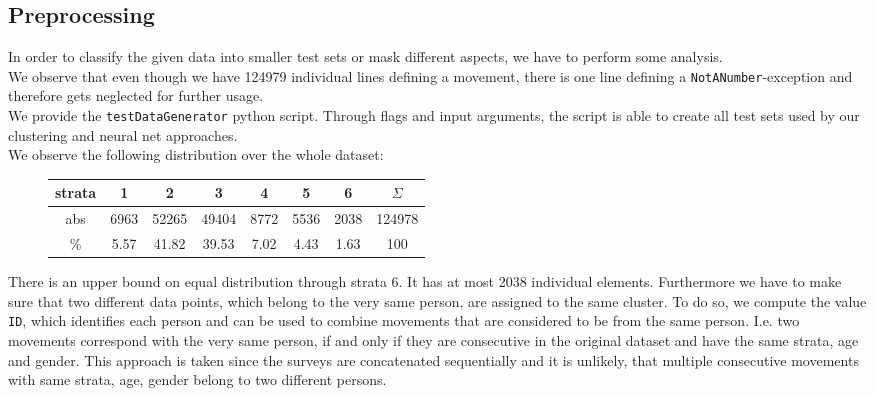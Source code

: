 \subsection{Preprocessing}\label{sec: proprocessing}
	In order to classify the given data into smaller test sets or mask different aspects, we have to perform some analysis.\\
	We observe that even though we have 124979 individual lines defining a movement, there is one line defining a \texttt{NotANumber}-exception and therefore gets neglected for further usage.	\\
	We provide the \texttt{testDataGenerator} python script. Through flags and input arguments, the script is able to create all test sets used by our clustering and neural net approaches.\\
	We observe the following distribution over the whole dataset:\\
	
	\vspace*{-3em}
	\begin{figure}[H]
		\centering		
		\setlength\tabcolsep{.2cm}
		\begin{tabular}{c|ccccccc}
			strata &  1   &   2   &   3   &  4   &  5   &  6   & $\Sigma$ \\ \hline
			abs   & 6963 & 52265 & 49404 & 8772 & 5536 & 2038 &  124978  \\
			\%   & 5.57 & 41.82 & 39.53 & 7.02 & 4.43 & 1.63 &   100
		\end{tabular}
		\vspace*{-2.5em}
		\label{table: distribution normal}
	\end{figure}
	There is an upper bound on equal distribution through strata 6. It has at most 2038 individual elements.
	Furthermore we have to make sure that two different data points, which belong to the very same person, are assigned to the same cluster. To do so, we compute the value \texttt{ID}, which identifies each person and can be used to combine movements that are considered to be from the same person. I.e. two movements correspond with the very same person, if and only if they are consecutive in the original dataset and have the same strata, age and gender. This approach is taken since the surveys are concatenated sequentially and it is unlikely, that multiple consecutive movements with same strata, age, gender belong to two different persons.\\
	
